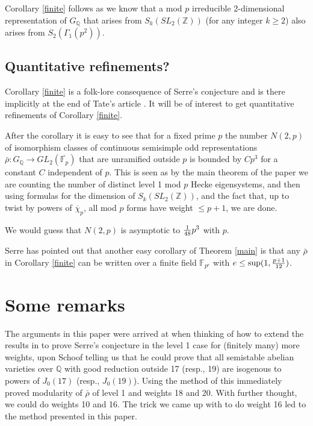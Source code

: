 \documentclass[12pt]{amsart}
\newcommand{\Q}{\mathbb{Q}}
\newcommand{\Z}{\mathbb{Z}}
\newcommand{\aFp}{\overline{\mathbb{F}_{p}}}
\newcommand{\rhobar}{\overline{\rho}}
\def\rhobar{ {\bar {\rho} } }
\def\rhob{ {\bar {\rho} } }
\newcommand{\F}{{\mathbb F}}
\begin{document}
Corollary \ref{finite} follows as we know that a mod $p$ irreducible 2-dimensional representation
of $G_\Q$ that arises from $S_k(SL_2(\Z))$ (for any integer $k\geq     2$) also arises from $S_2(\Gamma_1(p^2))$. 



\subsection{Quantitative refinements?} 

Corollary \ref{finite} is a folk-lore consequence of Serre's conjecture and 
is there implicitly at the end of Tate's  article \cite{Tate}.
It will be of interest to get quantitative refinements of Corollary \ref{finite}. 

 After the corollary it is easy to see that for a fixed prime $p$ the number
$N(2,p)$ of
isomorphism classes of continuous semisimple
 odd representations $\rhob:G_\Q \rightarrow GL_2(\aFp)$
 that are unramified outside $p$ is bounded by $Cp^3$ for a constant $C$ independent of $p$. This is seen as by the main theorem of the paper we are counting the number of distinct level 1 mod $p$ Hecke eigensystems, and then using formulas for the dimension of $S_k(SL_2(\Z))$, and the fact that, up to twist by powers of $\overline \chi_p$, all mod $p$ forms have weight $\leq p+1$, we are done. 

We would guess that $N(2,p)$ is asymptotic to ${1 \over {48}} p^3$ with $p$.

Serre has pointed out that another easy corollary of Theorem \ref{main} is that any  $\rhob$  in Corollary \ref{finite} can be
written over a finite field  $\F_{p^e}$  with  $e \leq {\rm sup}(1,{p+1 \over 12})$.

\section{Some remarks}

The arguments in this paper were arrived at when thinking of how to extend the results in \cite{KW} 
to prove Serre's conjecture in the level 1 case for 
(finitely many) more weights, upon Schoof telling us that he could prove that all semistable abelian varieties over $\Q$ with good reduction outside 17 (resp., 19) are isogenous to powers of $J_0(17)$ (resp., $J_0(19)$). Using the method of \cite{KW} this immediately proved modularity of $\rhobar$ of level 1 and weights 18 and 20. With further thought, we could do weights 10 and 16. The trick we came up with to do weight 16
led to the method presented in this paper. 
\end{document}
